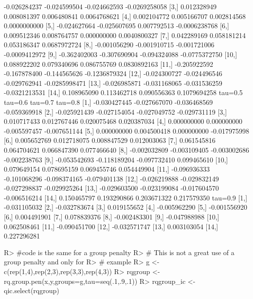 \documentclass[article]{rqPenVignette}%
\begin{document}
\begin{Schunk}
\begin{Soutput}
 [2,] -0.026284237 -0.024599504 -0.024662593 -0.0269258058
 [3,]  0.012328949  0.008081397  0.006480841  0.0064768621
 [4,]  0.002104772  0.005166707  0.002814568  0.0000000000
 [5,] -0.024627664 -0.025607695  0.007792513 -0.0006238768
 [6,]  0.009512346  0.008764757  0.000000000  0.0040800327
 [7,]  0.042289169  0.058181214  0.053186347  0.0687972724
 [8,] -0.001056290 -0.001910715 -0.001721006 -0.0009412972
 [9,] -0.362402003 -0.307690904 -0.094324088 -0.0775372750
[10,]  0.088922202  0.079340696  0.086755769  0.0830892163
[11,] -0.205922592 -0.167878400 -0.144565626 -0.1236879324
[12,] -0.024300727 -0.024496546 -0.029762941 -0.0285998471
[13,] -0.026985871 -0.031168065 -0.031536259 -0.0321213531
[14,]  0.108965090  0.113462718  0.090556363  0.1079694258
           tau=0.5      tau=0.6      tau=0.7      tau=0.8
 [1,] -0.030427445 -0.027667070 -0.036468569 -0.059369918
 [2,] -0.025921439 -0.027154054 -0.027049752 -0.029731119
 [3,]  0.010717433  0.012767446  0.020075468  0.020387034
 [4,]  0.000000000  0.000000000 -0.005597457 -0.007651144
 [5,]  0.000000000  0.004500418  0.000000000 -0.017975998
 [6,]  0.005652769  0.012718075  0.008847529  0.012003063
 [7,]  0.061545816  0.064704621  0.066847390  0.077466640
 [8,] -0.002032809 -0.003109405 -0.003002686 -0.002238763
 [9,] -0.053542693 -0.118189204 -0.097732410  0.099465610
[10,]  0.079649154  0.078695159  0.069455746  0.054449904
[11,] -0.096936333 -0.101068296 -0.098374165 -0.079401138
[12,] -0.026219888 -0.029832149 -0.027298837 -0.029925264
[13,] -0.029603500 -0.023199084 -0.017604570 -0.006516214
[14,]  0.150465797  0.193290866  0.203671322  0.217579350
           tau=0.9
 [1,] -0.031105032
 [2,] -0.032783674
 [3,]  0.019155652
 [4,] -0.005962290
 [5,] -0.001556920
 [6,]  0.004491901
 [7,]  0.078839376
 [8,] -0.002483301
 [9,] -0.047988988
[10,]  0.062508461
[11,] -0.090451700
[12,] -0.032571747
[13,]  0.003103054
[14,]  0.227296281
\end{Soutput}
\begin{Sinput}
R> #code is the same for a group penalty
R> # This is not a great use of a group penalty and only for
R> # example
R> g <- c(rep(1,4),rep(2,3),rep(3,3),rep(4,3))
R> rqgroup <- rq.group.pen(x,y,groups=g,tau=seq(.1,.9,.1))
R> rqgroup_ic <- qic.select(rqgroup)
\end{Sinput}
\end{Schunk}
\end{document}
